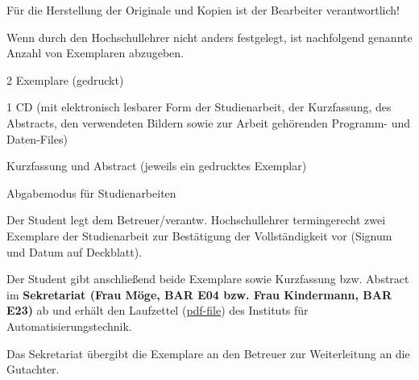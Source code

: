 Für die Herstellung der Originale und Kopien ist der Bearbeiter verantwortlich!

Wenn durch den Hochschullehrer nicht anders festgelegt, ist nachfolgend genannte Anzahl von Exemplaren abzugeben.

\begin{compactitem}
  \item 2 Exemplare (gedruckt)
  \item 1 CD (mit elektronisch lesbarer Form der Studienarbeit, der Kurzfassung, des Abstracts, den verwendeten Bildern
        sowie zur Arbeit gehörenden Programm- und Daten-Files)
  \item Kurzfassung und Abstract (jeweils ein gedrucktes Exemplar)
  \item Abgabemodus für Studienarbeiten
    \begin{compactitem}
      \item Der Student legt dem Betreuer/verantw. Hochschullehrer termingerecht zwei Exemplare der Studienarbeit zur Bestätigung der Vollständigkeit vor (Signum und Datum auf Deckblatt).
      \item Der Student gibt anschließend beide Exemplare sowie Kurzfassung bzw. Abstract im {\bf Sekretariat (Frau Möge, BAR E04 bzw. Frau Kindermann, BAR E23)} ab und erhält den Laufzettel (\href{http://www.et.tu-dresden.de/ifa/fileadmin/user_upload/www_files/richtlinien_sa_da/DA-SA_Laufzettel.pdf}{pdf-file}) des Instituts für Automatisierungstechnik.
      \item Das Sekretariat übergibt die Exemplare an den Betreuer zur Weiterleitung an die Gutachter.
  \end{compactitem}
\end{compactitem}


